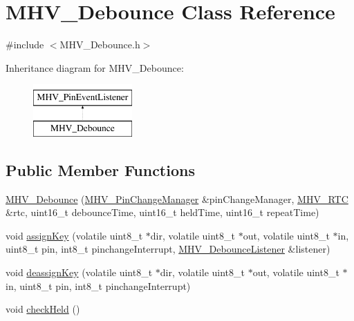 \hypertarget{class_m_h_v___debounce}{
\section{\-M\-H\-V\-\_\-\-Debounce \-Class \-Reference}
\label{class_m_h_v___debounce}
}


{\ttfamily \#include $<$\-M\-H\-V\-\_\-\-Debounce.\-h$>$}

\-Inheritance diagram for \-M\-H\-V\-\_\-\-Debounce\-:\begin{figure}[H]
\begin{center}
\leavevmode
\includegraphics[height=2.000000cm]{class_m_h_v___debounce}
\end{center}
\end{figure}
\subsection*{\-Public \-Member \-Functions}
\begin{DoxyCompactItemize}
\item 
\hyperlink{class_m_h_v___debounce_a68049104b4f0784dcd39658cbd0728ec}{\-M\-H\-V\-\_\-\-Debounce} (\hyperlink{class_m_h_v___pin_change_manager}{\-M\-H\-V\-\_\-\-Pin\-Change\-Manager} \&pin\-Change\-Manager, \hyperlink{class_m_h_v___r_t_c}{\-M\-H\-V\-\_\-\-R\-T\-C} \&rtc, uint16\-\_\-t debounce\-Time, uint16\-\_\-t held\-Time, uint16\-\_\-t repeat\-Time)
\item 
void \hyperlink{class_m_h_v___debounce_af00d5a07807378e7ef02030bd3a009de}{assign\-Key} (volatile uint8\-\_\-t $\ast$dir, volatile uint8\-\_\-t $\ast$out, volatile uint8\-\_\-t $\ast$in, uint8\-\_\-t pin, int8\-\_\-t pinchange\-Interrupt, \hyperlink{class_m_h_v___debounce_listener}{\-M\-H\-V\-\_\-\-Debounce\-Listener} \&listener)
\item 
void \hyperlink{class_m_h_v___debounce_a00f8ea47ef5e0b51a9169a162daa7338}{deassign\-Key} (volatile uint8\-\_\-t $\ast$dir, volatile uint8\-\_\-t $\ast$out, volatile uint8\-\_\-t $\ast$in, uint8\-\_\-t pin, int8\-\_\-t pinchange\-Interrupt)
\item 
void \hyperlink{class_m_h_v___debounce_a581f7626d54332eec3e34bb5367e1148}{check\-Held} ()
\end{DoxyCompactItemize}
